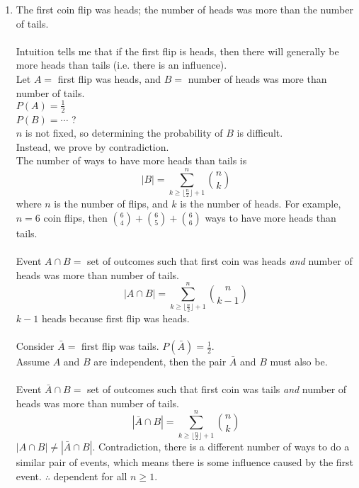 \documentclass[10pt,a4paper,final]{article}
\begin{document}
\begin{enumerate}
\begin{enumerate}
\item The first coin flip was heads; the number of heads was more than the number of tails. \\
\\
Intuition tells me that if the first flip is heads, then there will generally be more heads than tails
(i.e. there is an influence).\\
Let $A = $ first flip was heads, and $B = $ number of heads was more than number of tails.\\
$P(A) = \frac{1}{2}$\\
$P(B) = \cdots$ ?\\
$n$ is not fixed, so determining the probability of $B$ is difficult.\\
Instead, we prove by contradiction.\\
The number of ways to have more heads than tails is
\begin{equation*}
|B| = \sum_{k \geq \lfloor \frac{n}{2} \rfloor + 1}^n \binom{n}{k}
\end{equation*}
where $n$ is the number of flips, and $k$ is the number of heads.
For example, $n = 6$ coin flips, then $\binom{6}{4} + \binom{6}{5} + \binom{6}{6}$ ways to have more
heads than tails.\\
\\
Event $A \cap B = $ set of outcomes such that first coin was heads \emph{and} number of heads
was more than number of tails.\\
\begin{equation*}
|A \cap B| = \sum_{k \geq \lfloor \frac{n}{2} \rfloor + 1}^n \binom{n}{k-1}
\end{equation*}
$k-1$ heads because first flip was heads.\\
\\
Consider $\bar{A} = $ first flip was tails. $P(\bar{A}) = \frac{1}{2}$.\\
Assume $A$ and $B$ are independent, then the pair $\bar{A}$ and $B$ must also be.\\
\\
Event $\bar{A} \cap B = $ set of outcomes such that first coin was tails \emph{and} number of heads
was more than number of tails.\\
\begin{equation*}
|\bar{A} \cap B| = \sum_{k \geq \lfloor \frac{n}{2} \rfloor + 1}^n \binom{n}{k}
\end{equation*}
$|A \cap B| \neq |\bar{A} \cap B|$. Contradiction, there is a different number of ways to do
a similar pair of events, which means there is some influence caused by the first event.
$\therefore$ dependent for all $n \geq 1$.


\end{enumerate}
\end{enumerate}
\end{document}
